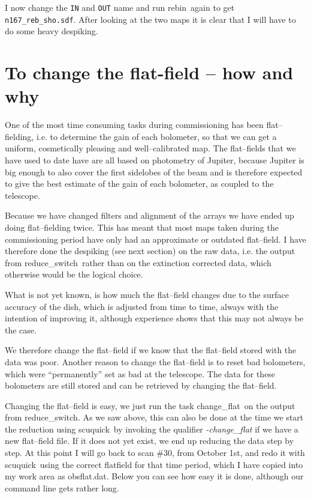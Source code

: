 \documentclass[twoside,11pt]{article}
\newcommand{\task}[1]{\textsf{#1}}
\newcommand{\param}[1]{\texttt{#1}}
\newcommand{\rebin}{\xref{\task{rebin}}{sun216}{REBIN}}
\newcommand{\chgflat}{\xref{\task{change\_flat}}{sun216}{CHANGE_FLAT}}
\newcommand{\resw}{\xref{\task{reduce\_switch}}{sun216}{REDUCE_SWITCH}}
\newcommand{\scuquick}{\xref{\task{scuquick}}{sun216}{SCUQUICK}}
\newcommand{\xref}[3]{#1}
\newcommand{\xlabel}[1]{}
\begin{document}
I now change the \param{IN} and \param{OUT} name and run \rebin\ again to get
\texttt{n167\_reb\_sho.sdf}. After looking at the two maps it is clear that
I will have to do some heavy despiking.

\section{\xlabel{to_change_a_falt_field_--_how_and_why}To change the flat-field -- how and why}

One of the most time consuming tasks during commissioning has been
flat--fielding, i.e. to determine the gain of each bolometer, so that
we can get a uniform, cosmetically pleasing and well--calibrated map.
The flat--fields that we have used to date have are all based on
photometry of Jupiter, because Jupiter is big enough to also cover the
first sidelobes of the beam and is therefore expected to give the best
estimate of the gain of each bolometer, as coupled to the telescope.

Because we have changed filters and alignment of the arrays we have ended
up doing flat--fielding twice. This has meant that most maps taken
during the commissioning period have only had an approximate or outdated
flat--field. I have therefore done the despiking (see next section) on
the raw data, i.e. the output from \resw\ rather than on the
extinction corrected data, which otherwise would be the logical choice.

What is not yet known, is how much the flat--field changes due to the
surface accuracy of the dish, which is adjusted from time to time,
always with the intention of improving it, although experience shows
that this may not always be the case.

We therefore change the flat--field if we know that the flat--field
stored with the data was poor. Another reason to change the flat--field
is to reset bad bolometers, which were ``permanently'' set as bad at
the telescope. The data for these bolometers are still stored and can
be retrieved by changing the flat--field.

Changing the flat--field is easy, we just run the task \chgflat\ on
the output from \resw. As we saw above, this can also be
done at the time we start the reduction using \scuquick\ by invoking
the qualifier {\it -change\_flat} if we have a new flat--field file. If it
does not yet exist, we end up reducing the data step by step. At this point
I will go back to scan \#30, from October 1st, and redo it with \scuquick\
using the correct flatfield for that time period, which I have copied into
my work area as obsflat.dat. Below you can see how easy it is done, although
our command line gets rather long. 
\end{document}
